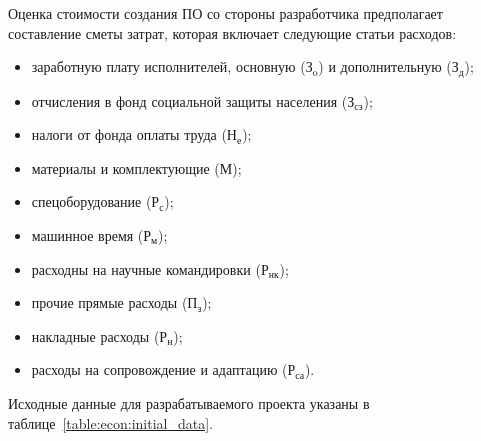 Оценка стоимости создания ПО со стороны разработчика предполагает составление сметы затрат, которая включает следующие статьи расходов:
\begin{itemize}

  \item заработную плату исполнителей, основную ($ \text{З}_{\text{o}} $) и дополнительную ($\text{З}_{\text{д}} $);

  \item отчисления в фонд социальной защиты населения ($ \text{З}_\text{сз} $);

  \item налоги от фонда оплаты труда ($ \text{Н}_\text{е} $);

  \item материалы и комплектующие ($ \text{М} $);

  \item спецоборудование ($ \text{Р}_\text{с} $);

  \item машинное время ($ \text{Р}_\text{м} $);

  \item расходны на научные командировки ($ \text{Р}_\text{нк} $);

  \item прочие прямые расходы ($ \text{П}_\text{з} $);

  \item накладные расходы ($ \text{Р}_\text{н} $);

  \item расходы на сопровождение и адаптацию ($ \text{Р}_\text{са} $).

\end{itemize}
Исходные данные для разрабатываемого проекта указаны в таблице~\ref{table:econ:initial_data}.

